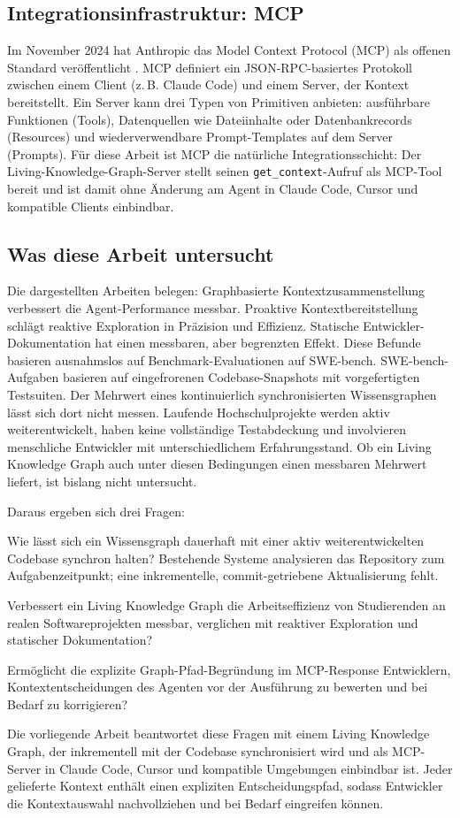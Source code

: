 \subsection*{Integrationsinfrastruktur: MCP}

Im November 2024 hat Anthropic das Model Context Protocol (MCP)
als offenen Standard veröffentlicht \parencite{anthropic2024mcp}.
MCP definiert ein JSON-RPC-basiertes Protokoll zwischen einem Client (z.\,B. Claude Code)
und einem Server, der Kontext bereitstellt.
Ein Server kann drei Typen von Primitiven anbieten:
ausführbare Funktionen (Tools),
Datenquellen wie Dateiinhalte oder Datenbankrecords (Resources)
und wiederverwendbare Prompt-Templates auf dem Server (Prompts).
Für diese Arbeit ist MCP die natürliche Integrationsschicht:
Der Living-Knowledge-Graph-Server stellt seinen \texttt{get\_context}-Aufruf
als MCP-Tool bereit und ist damit ohne Änderung am Agent
in Claude Code, Cursor und kompatible Clients einbindbar.

\subsection*{Was diese Arbeit untersucht}

Die dargestellten Arbeiten belegen:
Graphbasierte Kontextzusammenstellung verbessert die Agent-Performance messbar.
Proaktive Kontextbereitstellung schlägt reaktive Exploration in Präzision und Effizienz.
Statische Entwickler-Dokumentation hat einen messbaren, aber begrenzten Effekt.
Diese Befunde basieren ausnahmslos auf Benchmark-Evaluationen auf SWE-bench.
SWE-bench-Aufgaben basieren auf eingefrorenen Codebase-Snapshots mit vorgefertigten Testsuiten.
Der Mehrwert eines kontinuierlich synchronisierten Wissensgraphen lässt sich dort nicht messen.
Laufende Hochschulprojekte werden aktiv weiterentwickelt, haben keine vollständige Testabdeckung
und involvieren menschliche Entwickler mit unterschiedlichem Erfahrungsstand.
Ob ein Living Knowledge Graph auch unter diesen Bedingungen einen messbaren Mehrwert liefert,
ist bislang nicht untersucht.

Daraus ergeben sich drei Fragen:

Wie lässt sich ein Wissensgraph dauerhaft mit einer aktiv weiterentwickelten
Codebase synchron halten?
Bestehende Systeme analysieren das Repository zum Aufgabenzeitpunkt;
eine inkrementelle, commit-getriebene Aktualisierung fehlt.

Verbessert ein Living Knowledge Graph die Arbeitseffizienz von Studierenden
an realen Softwareprojekten messbar,
verglichen mit reaktiver Exploration und statischer Dokumentation?

Ermöglicht die explizite Graph-Pfad-Begründung im MCP-Response Entwicklern,
Kontextentscheidungen des Agenten vor der Ausführung zu bewerten
und bei Bedarf zu korrigieren?

Die vorliegende Arbeit beantwortet diese Fragen mit einem Living Knowledge Graph,
der inkrementell mit der Codebase synchronisiert wird
und als MCP-Server in Claude Code, Cursor und kompatible Umgebungen einbindbar ist.
Jeder gelieferte Kontext enthält einen expliziten Entscheidungspfad,
sodass Entwickler die Kontextauswahl nachvollziehen und bei Bedarf eingreifen können.
